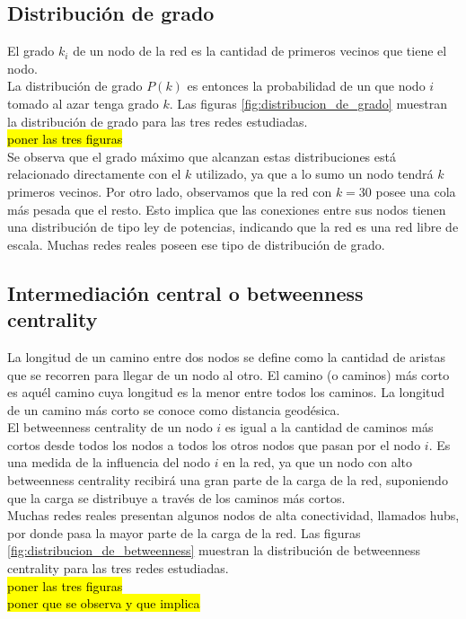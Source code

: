 \subsection*{Distribución de grado}
El grado $k_i$ de un nodo de la red es la cantidad de primeros vecinos que tiene el nodo.\\
La distribución de grado $P(k)$ es entonces la probabilidad de un que nodo $i$ tomado al azar tenga grado $k$. Las figuras \ref{fig:distribucion_de_grado} muestran la distribución de grado para las tres redes estudiadas.\\
\hl{poner las tres figuras}\\
Se observa que el grado máximo que alcanzan estas distribuciones está relacionado directamente con el $k$ utilizado, ya que a lo sumo un nodo tendrá $k$ primeros vecinos. Por otro lado, observamos que la red con $k=30$ posee una cola más pesada que el resto. Esto implica que las conexiones entre sus nodos tienen una distribución de tipo ley de potencias, indicando que la red es una red libre de escala. Muchas redes reales poseen ese tipo de distribución de grado.\\
\subsection*{Intermediación central o betweenness centrality}
La longitud de un camino entre dos nodos se define como la cantidad de aristas que se recorren para llegar de un nodo al otro. El camino (o caminos) más corto es aquél camino cuya longitud es la menor entre todos los caminos. La longitud de un camino más corto se conoce como distancia geodésica.\\
El betweenness centrality de un nodo $i$ es igual a la cantidad de caminos más cortos desde todos los nodos a todos los otros nodos que pasan por el nodo $i$. Es una medida de la influencia del nodo $i$ en la red, ya que un nodo con alto betweenness centrality recibirá una gran parte de la carga de la red, suponiendo que la carga se distribuye a través de los caminos más cortos.\\
Muchas redes reales presentan algunos nodos de alta conectividad, llamados hubs, por donde pasa la mayor parte de la carga de la red.
Las figuras \ref{fig:distribucion_de_betweenness} muestran la distribución de betweenness centrality para las tres redes estudiadas.\\
\hl{poner las tres figuras}\\
\hl{poner que se observa y que implica}\\

